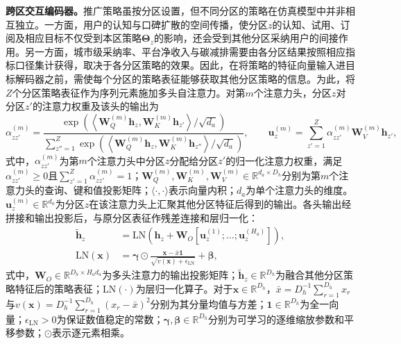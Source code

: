 \textbf{跨区交互编码器。}推广策略虽按分区设置，但不同分区的策略在仿真模型中并非相互独立。一方面，用户的认知与口碑扩散的空间传播，使分区$z$的认知、试用、订阅及相应目标不仅受到本区策略$\bm{\Theta}_{z}$的影响，还会受到其他分区采纳用户的间接作用。另一方面，城市级采纳率、平台净收入与碳减排需要由各分区结果按照相应指标口径集计获得，取决于各分区策略的效果。因此，在将策略的特征向量输入进目标解码器之前，需使每个分区的策略表征能够获取其他分区策略的信息。为此，将$Z$个分区策略表征作为序列元素施加多头自注意力。对第$m$个注意力头，分区$z$对分区$z'$的注意力权重及该头的输出为
\begin{equation}
\alpha_{zz'}^{(m)}
=\frac{
\exp\left(
\left\langle
\bm{W}_{Q}^{(m)}\bm{h}_{z},
\bm{W}_{K}^{(m)}\bm{h}_{z'}
\right\rangle/\sqrt{d_a}
\right)}
{\displaystyle
\sum_{z''=1}^{Z}
\exp\left(
\left\langle
\bm{W}_{Q}^{(m)}\bm{h}_{z},
\bm{W}_{K}^{(m)}\bm{h}_{z''}
\right\rangle/\sqrt{d_a}
\right)},
\qquad
\bm{u}_{z}^{(m)}
=\sum_{z'=1}^{Z}\alpha_{zz'}^{(m)}
\bm{W}_{V}^{(m)}\bm{h}_{z'},
\label{eq.opt.mhsa}
\end{equation}
式中，$\alpha_{zz'}^{(m)}$为第$m$个注意力头中分区$z$分配给分区$z'$的归一化注意力权重，满足$\alpha_{zz'}^{(m)}\geq 0$且$\sum_{z'=1}^{Z}\alpha_{zz'}^{(m)}=1$；$\bm{W}_{Q}^{(m)},\bm{W}_{K}^{(m)},\bm{W}_{V}^{(m)}\in\mathbb{R}^{d_a\times D_h}$分别为第$m$个注意力头的查询、键和值投影矩阵；$\langle\cdot,\cdot\rangle$表示向量内积；$d_a$为单个注意力头的维度。$\bm{u}_{z}^{(m)}\in\mathbb{R}^{d_a}$为分区$z$在该注意力头上汇聚其他分区特征后得到的输出。各头输出经拼接和输出投影后，与原分区表征作残差连接和层归一化：
\begin{equation}
\begin{aligned}
\tilde{\bm{h}}_{z}
&=\mathrm{LN}\left(
\bm{h}_{z}
+\bm{W}_{O}
\left[\bm{u}_{z}^{(1)};\ldots;\bm{u}_{z}^{(H_a)}\right]
\right),\\
\mathrm{LN}(\bm{x})
&=\bm{\gamma}\odot
\frac{\bm{x}-\bar{x}\bm{1}}
{\sqrt{v(\bm{x})+\epsilon_{\mathrm{LN}}}}
+\bm{\beta},
\end{aligned}
\label{eq.opt.attention}
\end{equation}
式中，$\bm{W}_{O}\in\mathbb{R}^{D_h\times H_a d_a}$为多头注意力的输出投影矩阵；$\widetilde{\bm{h}}_{z}\in\mathbb{R}^{D_h}$为融合其他分区策略特征后的策略表征；$\mathrm{LN}(\cdot)$为层归一化算子。对于$\bm{x}\in\mathbb{R}^{D_h}$，$\bar{x}=D_h^{-1}\sum_{r=1}^{D_h}x_r$与$v(\bm{x})=D_h^{-1}\sum_{r=1}^{D_h}(x_r-\bar{x})^2$分别为其分量均值与方差；$\bm{1}\in\mathbb{R}^{D_h}$为全一向量；$\epsilon_{\mathrm{LN}}>0$为保证数值稳定的常数；$\bm{\gamma},\bm{\beta}\in\mathbb{R}^{D_h}$分别为可学习的逐维缩放参数和平移参数；$\odot$表示逐元素相乘。

